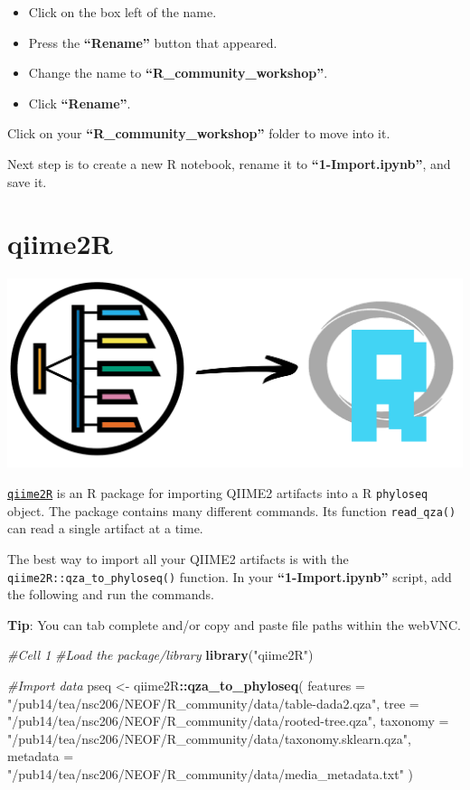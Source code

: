 \documentclass[
]{book}
\newenvironment{Shaded}{\begin{snugshade}}{\end{snugshade}}
\newcommand{\AttributeTok}[1]{\textcolor[rgb]{0.13,0.29,0.53}{#1}}
\newcommand{\CommentTok}[1]{\textcolor[rgb]{0.56,0.35,0.01}{\textit{#1}}}
\newcommand{\FunctionTok}[1]{\textcolor[rgb]{0.13,0.29,0.53}{\textbf{#1}}}
\newcommand{\NormalTok}[1]{#1}
\newcommand{\OtherTok}[1]{\textcolor[rgb]{0.56,0.35,0.01}{#1}}
\newcommand{\SpecialCharTok}[1]{\textcolor[rgb]{0.81,0.36,0.00}{\textbf{#1}}}
\newcommand{\StringTok}[1]{\textcolor[rgb]{0.31,0.60,0.02}{#1}}
\providecommand{\tightlist}{%
  \setlength{\itemsep}{0pt}\setlength{\parskip}{0pt}}
\begin{document}
\begin{itemize}
\tightlist
\item
  Click on the box left of the name.
\item
  Press the \textbf{``Rename''} button that appeared.
\item
  Change the name to \textbf{``R\_community\_workshop''}.
\item
  Click \textbf{``Rename''}.
\end{itemize}

Click on your \textbf{``R\_community\_workshop''} folder to move into it.

Next step is to create a new R notebook, rename it to \textbf{``1-Import.ipynb''}, and save it.

\hypertarget{qiime2r}{%
\section{qiime2R}\label{qiime2r}}

\includegraphics{figures/qiime2r.png}

\href{https://github.com/jbisanz/qiime2R}{\texttt{qiime2R}} is an R package for importing QIIME2 artifacts into a R \texttt{phyloseq} object. The package contains many different commands. Its function \texttt{read\_qza()} can read a single artifact at a time.

The best way to import all your QIIME2 artifacts is with the \texttt{qiime2R::qza\_to\_phyloseq()} function. In your \textbf{``1-Import.ipynb''} script, add the following and run the commands.

\textbf{Tip}: You can tab complete and/or copy and paste file paths within the webVNC.

\begin{Shaded}
\begin{Highlighting}[]
\CommentTok{\#Cell 1}
\CommentTok{\#Load the package/library}
\FunctionTok{library}\NormalTok{(}\StringTok{"qiime2R"}\NormalTok{)}

\CommentTok{\#Import data}
\NormalTok{pseq }\OtherTok{\textless{}{-}}\NormalTok{ qiime2R}\SpecialCharTok{::}\FunctionTok{qza\_to\_phyloseq}\NormalTok{(}
  \AttributeTok{features =} \StringTok{"/pub14/tea/nsc206/NEOF/R\_community/data/table{-}dada2.qza"}\NormalTok{,}
  \AttributeTok{tree =} \StringTok{"/pub14/tea/nsc206/NEOF/R\_community/data/rooted{-}tree.qza"}\NormalTok{,}
  \AttributeTok{taxonomy =} \StringTok{"/pub14/tea/nsc206/NEOF/R\_community/data/taxonomy.sklearn.qza"}\NormalTok{,}
  \AttributeTok{metadata =} \StringTok{"/pub14/tea/nsc206/NEOF/R\_community/data/media\_metadata.txt"}
\NormalTok{)}
\end{Highlighting}
\end{Shaded}
\end{document}
